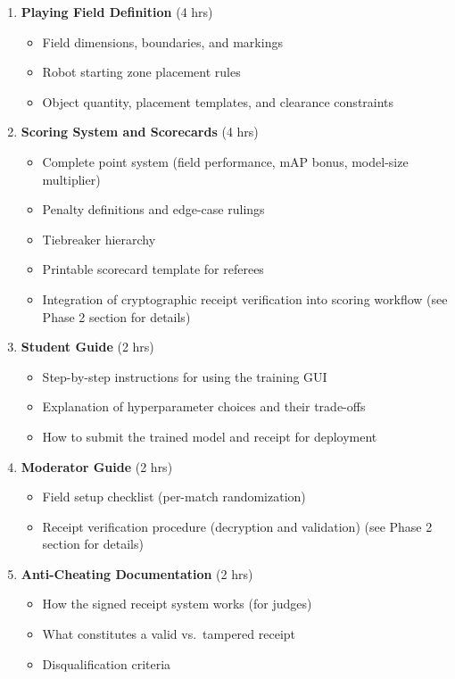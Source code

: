 \documentclass[a4paper]{article}
\begin{document}
\begin{enumerate}[leftmargin=*]
    \item \textbf{Playing Field Definition} (4 hrs)
    \begin{itemize}
        \item Field dimensions, boundaries, and markings
        \item Robot starting zone placement rules
        \item Object quantity, placement templates, and clearance constraints
    \end{itemize}

    \item \textbf{Scoring System and Scorecards} (4 hrs)
    \begin{itemize}
        \item Complete point system (field performance, mAP bonus, model-size multiplier)
        \item Penalty definitions and edge-case rulings
        \item Tiebreaker hierarchy
        \item Printable scorecard template for referees
        \item Integration of cryptographic receipt verification into scoring workflow (see Phase 2 section for details)
    \end{itemize}

    \item \textbf{Student Guide} (2 hrs)
    \begin{itemize}
        \item Step-by-step instructions for using the training GUI
        \item Explanation of hyperparameter choices and their trade-offs
        \item How to submit the trained model and receipt for deployment
    \end{itemize}

    \item \textbf{Moderator Guide} (2 hrs)
    \begin{itemize}
        \item Field setup checklist (per-match randomization)
        \item Receipt verification procedure (decryption and validation) (see Phase 2 section for details)
    \end{itemize}

    \item \textbf{Anti-Cheating Documentation} (2 hrs)
    \begin{itemize}
        \item How the signed receipt system works (for judges)
        \item What constitutes a valid vs.\ tampered receipt
        \item Disqualification criteria
    \end{itemize}
\end{enumerate}
\end{document}
